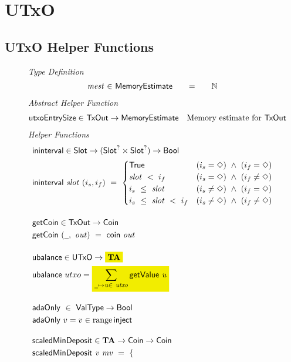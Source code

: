 \section{UTxO}
\label{sec:utxo}

\subsection*{UTxO Helper Functions}

\begin{figure}[htb]
  \emph{Type Definition}
  \begin{equation*}
    \begin{array}{r@{~\in~}l@{\qquad=\qquad}lr}
      \var{mest} & \MemoryEstimate & \N
    \end{array}
  \end{equation*}
  \emph{Abstract Helper Function}
  \begin{align*}
    \mathsf{utxoEntrySize} \in& ~\mathsf{TxOut} \to \mathsf{MemoryEstimate} & \text{Memory estimate for}~\mathsf{TxOut}
  \end{align*}
  \emph{Helper Functions}
  \begin{align*}
    & \fun{ininterval} \in \Slot \to (\Slot^? \times \Slot^?) \to \Bool \\
    & \fun{ininterval}~\var{slot}~(i_s, i_f) ~=~
    \begin{cases}
      \True & (i_s = \Nothing)~\wedge~(i_f = \Nothing) \\
      \var{slot}~<~i_f & (i_s = \Nothing)~\wedge~(i_f \neq \Nothing)\\
      i_s~\leq~\var{slot} & (i_s \neq \Nothing)~\wedge~(i_f = \Nothing) \\
      i_s~\leq~\var{slot}~<~i_f & (i_s \neq \Nothing)~\wedge~(i_f \neq \Nothing)
    \end{cases}
    \nextdef
    & \fun{getCoin} \in \TxOut \to \Coin \\
    & \fun{getCoin}~{(\wcard,~\var{out})} ~=~\fun{coin}~\var{out}
    \nextdef
    & \fun{ubalance} \in \UTxO \to \hldiff{\ValMonoid} \\
    & \fun{ubalance} ~ utxo = \hldiff{\sum_{\wcard\mapsto\var{u}\in~\var{utxo}} \fun{getValue}~\var{u}}
    \nextdef
    & \fun{adaOnly} ~\in~ \mathsf{ValType} \to \Bool \\
    & \fun{adaOnly}~v = v \in \range \fun{inject}
    \nextdef
    & \fun{scaledMinDeposit} \in \ValMonoid \to \Coin \to \Coin \\
    & \fun{scaledMinDeposit}~\var{v}~\var{mv} ~=~
    \begin{cases}

\end{cases}
\end{align*}
\end{figure}
